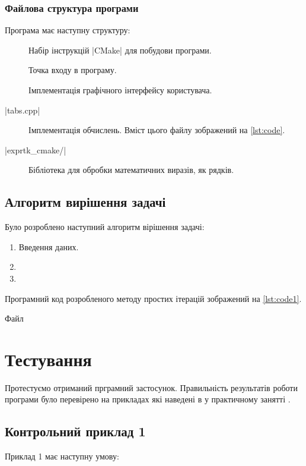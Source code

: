 \documentclass[../../../../document]{subfiles}
\begin{document}
	\subsection{Файлова структура програми}
	Програма має наступну структуру:
	\begin{description}
		\item[]
			Набір інструкцій \textinline|CMake| для побудови програми. 
		\item[]
			Точка входу в програму. 
		\item[]
			Імплементація графічного інтерфейсу користувача. 
		\item[\textinline|tabs.cpp|]
			Імплементація обчислень. Вміст цього файлу зображений на \cref{lst:code}.
		\item[\textinline|exprtk_cmake/|] Бібліотека для обробки математичних виразів, як рядків.
	\end{description}

	\section{Алгоритм вирішення задачі}
	Було розроблено наступний алгоритм вірішення задачі:
	\begin{enumerate}
		\item Введення даних. 
		\item
		\item
	\end{enumerate}	

	Програмний код розробленого методу простих ітерацій зображений на \cref{lst:code1}.
	\begin{longlisting}
		 \begin{Center}
		 \end{Center}
		 \caption{Файл }\label{lst:code1}
	\end{longlisting}

	\FloatBarrier
	\chapter{Тестування}
	Протестуємо отриманий прграмний застосунок. 
	Правильність результатів роботи програми було перевірено на прикладах які наведені в \cite{computational_methods} у практичному занятті \prodnumber{}.
	\section{Контрольний приклад 1}
	Приклад 1 має наступну умову:
\end{document}
